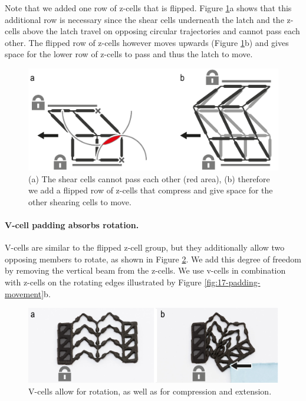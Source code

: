 Note that we added one row of z-cells that is flipped. Figure \ref{fig:18-padding-trajectories}a shows that this additional row is necessary since the shear cells underneath the latch and the z-cells above the latch travel on opposing circular trajectories and cannot pass each other. The flipped row of z-cells however moves upwards (Figure \ref{fig:18-padding-trajectories}b) and gives space for the lower row of z-cells to pass and thus the latch to move.

\begin{figure} [h]  
    \includegraphics[width=\textwidth]{chapters/metamaterial-mechanisms-FIG/18-padding-trajectories.pdf}
    \caption[Short figure name.]{(a) The shear cells cannot pass each other (red area), (b) therefore we add a flipped row of z-cells that compress and give space for the other shearing cells to move.
    \label{fig:18-padding-trajectories}}
\end{figure}

\paragraph{V-cell padding absorbs rotation.} V-cells are similar to the flipped z-cell group, but they additionally allow two opposing members to rotate, as shown in Figure \ref{fig:19-v-cells}. We add this degree of freedom by removing the vertical beam from the z-cells. We use v-cells in combination with z-cells on the rotating edges illustrated by Figure \ref{fig:17-padding-movement}b. 

\begin{figure} [h]  
    \includegraphics[width=\textwidth]{chapters/metamaterial-mechanisms-FIG/19-v-cells.pdf}
    \caption[Short figure name.]{V-cells allow for rotation, as well as for compression and extension.
    \label{fig:19-v-cells}}
\end{figure}


